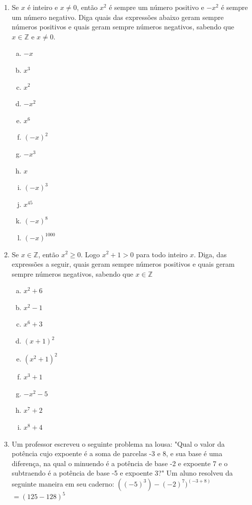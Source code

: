 \documentclass[a4paper,14pt]{article}
\begin{document}
\begin{multicols}{2}
\begin{enumerate}
\begin{enumerate}[A)]
			\end{enumerate}
			\item Se $x$ é inteiro e $x \neq 0$, então $x^2$ é sempre um número positivo e $-x^2$ é sempre um número negativo. Diga quais das expressões abaixo geram sempre números positivos e quais geram sempre números negativos, sabendo que $x \in \mathbb{Z}$ e $x \neq 0$.
			\begin{enumerate}[a)]
				\item $-x$
				\item $x^3$
				\item $x^2$
				\item $-x^2$
				\item $x^6$
				\item $(-x)^2$
				\item $-x^3$
				\item $x$
				\item $(-x)^3$
				\item $x^45$
				\item $(-x)^8$
				\item $(-x)^{1000}$
			\end{enumerate}
			\item Se $x \in \mathbb{Z}$, então $x^2 \geq 0$. Logo $x^2 + 1 > 0$ para todo inteiro $x$. Diga, das expressões a seguir, quais geram sempre números positivos e quais geram sempre números negativos, sabendo que $x \in \mathbb{Z}$
			\begin{enumerate}[a)]
				\item $x^2 + 6$
				\item $x^2 -1$
				\item $x^6 + 3$
				\item $(x + 1)^2$
				\item $(x^2 + 1)^2$
				\item $x^3 + 1$
				\item $-x^2 - 5$
				\item $x^7 + 2$
				\item $x^8 + 4$
			\end{enumerate}
			\item Um professor escreveu o seguinte problema na lousa: "Qual o valor da potência cujo expoente é a soma de parcelas -3 e 8, e sua base é uma diferença, na qual o minuendo é a potência de base -2 e expoente 7 e o subtraendo é a potência de base -5 e expoente 3?"
			Um aluno resolveu da seguinte maneira em seu caderno:
			$((-5)^3)-(-2)^7)^{(-3 + 8)}$ \\
			$= (125 - 128)^5$ \\

\end{enumerate}
\end{multicols}
\end{document}
